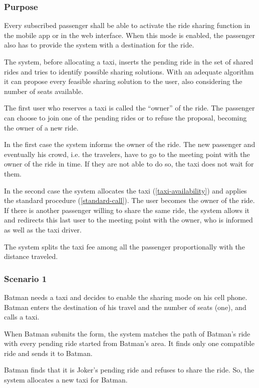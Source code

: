 \label{ride-sharing}
\subsubsection{Purpose}

Every subscribed passenger shall be able to activate the ride sharing function in the mobile app or in the web interface. When this mode is enabled, the passenger also has to provide the system with a destination for the ride.

The system, before allocating a taxi, inserts the pending ride in the set of shared rides and tries to identify possible sharing solutions.
With an adequate algorithm it can propose every feasible sharing solution to the user, also considering the number of seats available.

The first user who reserves a taxi is called the ``owner'' of the ride.
The passenger can choose to join one of the pending rides or to refuse the proposal, becoming the owner of a new ride.

In the first case the system informs the owner of the ride. The new passenger and eventually his crowd, i.e. the travelers, have to go to the meeting point with the owner of the ride in time. If they are not able to do so, the taxi does not wait for them.

In the second case the system allocates the taxi (\autoref{taxi-availability}) and applies the standard procedure (\autoref{standard-call}).  The user becomes the owner of the ride.
If there is another passenger willing to share the same ride, the system allows it and redirects this last user to the meeting point with the owner, who is informed as well as the taxi driver.

The system splits the taxi fee among all the passenger proportionally with the distance traveled.

\subsubsection{Scenario 1}
Batman needs a taxi and decides to enable the sharing mode on his cell phone. Batman enters the destination of his travel and the number of seats (one), and calls a taxi.

When Batman submits the form, the system matches the path of Batman's ride with every pending ride started from Batman's area. It finds only one compatible ride and sends it to Batman.

Batman finds that it is Joker's pending ride and refuses to share the ride.
So, the system allocates a new taxi for Batman.

